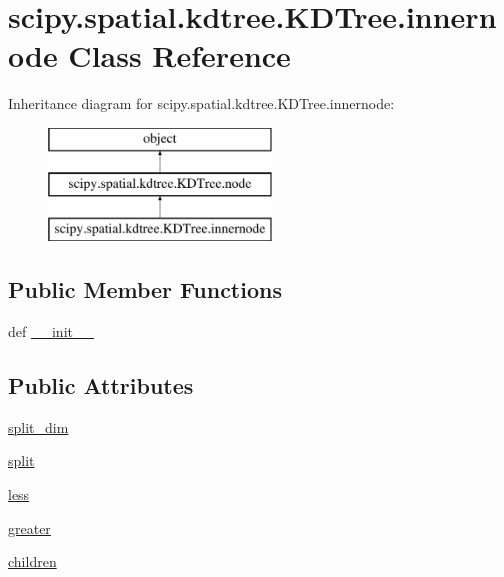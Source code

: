 \hypertarget{classscipy_1_1spatial_1_1kdtree_1_1KDTree_1_1innernode}{}\section{scipy.\+spatial.\+kdtree.\+K\+D\+Tree.\+innernode Class Reference}
\label{classscipy_1_1spatial_1_1kdtree_1_1KDTree_1_1innernode}
Inheritance diagram for scipy.\+spatial.\+kdtree.\+K\+D\+Tree.\+innernode\+:\begin{figure}[H]
\begin{center}
\leavevmode
\includegraphics[height=3.000000cm]{classscipy_1_1spatial_1_1kdtree_1_1KDTree_1_1innernode}
\end{center}
\end{figure}
\subsection*{Public Member Functions}
\begin{DoxyCompactItemize}
\item 
def \hyperlink{classscipy_1_1spatial_1_1kdtree_1_1KDTree_1_1innernode_a8c046403e2ed8b2e743d2eac196a23b8}{\+\_\+\+\_\+init\+\_\+\+\_\+}
\end{DoxyCompactItemize}
\subsection*{Public Attributes}
\begin{DoxyCompactItemize}
\item 
\hyperlink{classscipy_1_1spatial_1_1kdtree_1_1KDTree_1_1innernode_a86dfec56bf5e8174898ffb25966b16d8}{split\+\_\+dim}
\item 
\hyperlink{classscipy_1_1spatial_1_1kdtree_1_1KDTree_1_1innernode_a35f923f55ceacb28215f126d1e538d00}{split}
\item 
\hyperlink{classscipy_1_1spatial_1_1kdtree_1_1KDTree_1_1innernode_ad43c7d7bbdfa8211535bccfe18242947}{less}
\item 
\hyperlink{classscipy_1_1spatial_1_1kdtree_1_1KDTree_1_1innernode_a50df50d61971202bb0cb909f1c5e2ffd}{greater}
\item 
\hyperlink{classscipy_1_1spatial_1_1kdtree_1_1KDTree_1_1innernode_a14633381a3d9531becc98ecad20d51d5}{children}
\end{DoxyCompactItemize}



